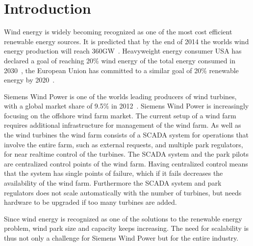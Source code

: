 \chapter{Introduction}
\label{chap:intro}

Wind energy is widely becoming recognized as one of the most cost efficient renewable energy sources.
It is predicted that by the end of 2014 the worlds wind energy production will reach 360GW~\cite{worldwidewindcapacity}.
Heavyweight energy consumer USA has declared a goal of reaching 20\% wind energy of the total energy consumed in 2030~\cite{20percentenergy}, the European Union has committed to a similar goal of 20\% renewable energy by 2020~\cite{directive2009}.

Siemens Wind Power is one of the worlds leading producers of wind turbines, with a global market share of 9.5\% in 2012~\cite{worldmarketupdate2012}.
Siemens Wind Power is increasingly focusing on the offshore wind farm market.
The current setup of a wind farm requires additional infrastructure for management of the wind farm.
As well as the wind turbines the wind farm consists of a SCADA system for operations that involve the entire farm, such as external requests, and multiple park regulators, for near realtime control of the turbines.
The SCADA system and the park pilots are centralized control points of the wind farm. Having centralized control means that the system has single points of failure, which if it fails decreases the availability of the wind farm.
Furthermore the SCADA system and park regulators does not scale automatically with the number of turbines, but needs hardware to be upgraded if too many turbines are added.

Since wind energy is recognized as one of the solutions to the renewable energy problem, wind park size and capacity keeps increasing.
The need for scalability is thus not only a challenge for Siemens Wind Power but for the entire industry.

